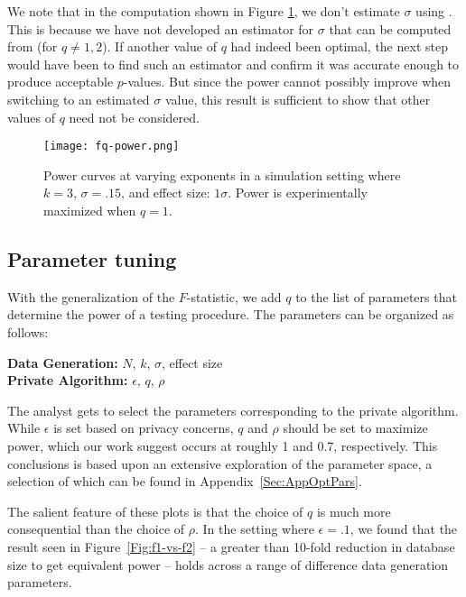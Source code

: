 We note that in the computation shown in Figure \ref{fig:fqpower}, we don't estimate $\sigma$ using \sqe.  This is because we have not developed an estimator for $\sigma$ that can be computed from \sqe (for $q \ne 1, 2$).  If another value of $q$ had indeed been optimal, the next step would have been to find such an estimator and confirm it was accurate enough to produce acceptable $p$-values.  But since the power cannot possibly improve when switching to an estimated $\sigma$ value, this result is sufficient to show that other values of $q$ need not be considered.


\begin{figure}
\centering
\texttt{[image: fq-power.png]}
\caption{Power curves at varying exponents in a simulation setting where $k = 3$, $\sigma = .15$, and effect size: $1\sigma$. Power is experimentally maximized when $q = 1$.}\label{fig:fqpower}
\end{figure}



\subsection{Parameter tuning}\label{subsec:params}

With the generalization of the $F$-statistic, we add $q$ to the list of parameters that determine the power of a testing procedure. The parameters can be organized as follows:

\vspace{3mm}
\textbf{Data Generation:} $N$, $k$, $\sigma$, effect size \\
\indent\textbf{Private Algorithm:} $\epsilon$, $q$, $\rho$
\vspace{3mm}

The analyst gets to select the parameters corresponding to the private algorithm. While
$\epsilon$ is set based on privacy concerns, $q$ and $\rho$ should be set to 
maximize power, which our work suggest occurs at roughly 1 and 0.7, respectively.
This conclusions is based upon an extensive exploration of the parameter space, 
a selection of which can be found in Appendix~\ref{Sec:AppOptPars}.

The salient feature of these plots is that the choice of $q$ is much more 
consequential than the choice of $\rho$. In the setting where $\epsilon = .1$, 
we found that the result seen in Figure~\ref{Fig:f1-vs-f2} -- a greater than 
10-fold reduction in database size to get equivalent power -- holds across a range
of difference data generation parameters.

